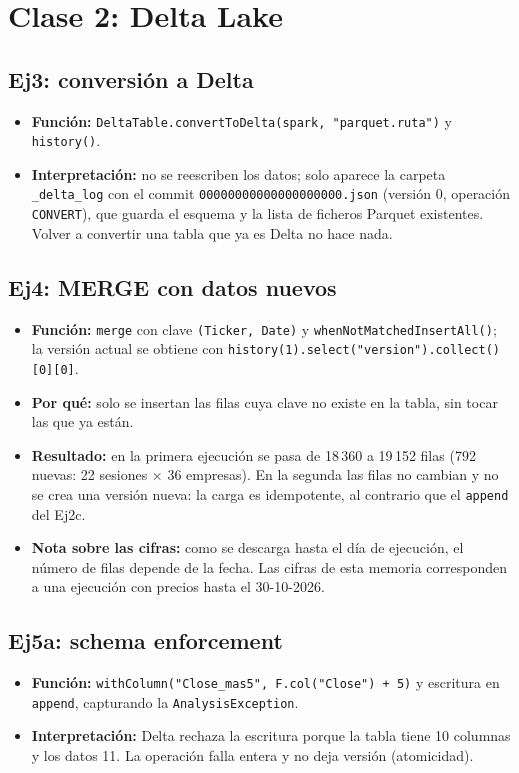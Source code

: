 \documentclass[11pt,a4paper]{article}
\newcommand{\code}[1]{\texttt{#1}}
\begin{document}
\section*{Clase 2: Delta Lake}

\subsection*{Ej3: conversión a Delta}
\begin{itemize}
    \item \textbf{Función:} \code{DeltaTable.convertToDelta(spark, "parquet.\textasciigrave ruta\textasciigrave")} y \code{history()}.
    \item \textbf{Interpretación:} no se reescriben los datos; solo aparece la carpeta \code{\_delta\_log} con el commit \code{00000000000000000000.json} (versión 0, operación \code{CONVERT}), que guarda el esquema y la lista de ficheros Parquet existentes. Volver a convertir una tabla que ya es Delta no hace nada.
\end{itemize}

\subsection*{Ej4: MERGE con datos nuevos}
\begin{itemize}
    \item \textbf{Función:} \code{merge} con clave \code{(Ticker, Date)} y \code{whenNotMatchedInsertAll()}; la versión actual se obtiene con \code{history(1).select("version").collect()[0][0]}.
    \item \textbf{Por qué:} solo se insertan las filas cuya clave no existe en la tabla, sin tocar las que ya están.
    \item \textbf{Resultado:} en la primera ejecución se pasa de 18\,360 a 19\,152 filas (792 nuevas: 22 sesiones $\times$ 36 empresas). En la segunda las filas no cambian y no se crea una versión nueva: la carga es idempotente, al contrario que el \code{append} del Ej2c.
    \item \textbf{Nota sobre las cifras:} como se descarga hasta el día de ejecución, el número de filas depende de la fecha. Las cifras de esta memoria corresponden a una ejecución con precios hasta el 30-10-2026.
\end{itemize}

\subsection*{Ej5a: schema enforcement}
\begin{itemize}
    \item \textbf{Función:} \code{withColumn("Close\_mas5", F.col("Close") + 5)} y escritura en \code{append}, capturando la \code{AnalysisException}.
    \item \textbf{Interpretación:} Delta rechaza la escritura porque la tabla tiene 10 columnas y los datos 11. La operación falla entera y no deja versión (atomicidad).
\end{itemize}
\end{document}
